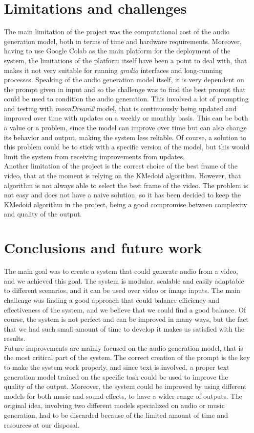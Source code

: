 \documentclass[conference]{IEEEtran}
\begin{document}
\section{Limitations and challenges}
The main limitation of the project was the computational cost of the audio generation model, both in terms of time and hardware requirements. 
Moreover, having to use Google Colab as the main platform for the deployment of the system, the limitations of the platform itself have been a point to deal with, that makes it not very suitable for running \textit{gradio} interfaces and long-running processes. 
Speaking of the audio generation model itself, it is very dependent on the prompt given in input and so the challenge was to find the best prompt that could be used to condition the audio generation.
This involved a lot of prompting and testing with \textit{moonDream2} model, that is continuously being updated and improved over time with updates on a weekly or monthly basis. This can be 
both a value or a problem, since the model can improve over time but can also change its behavior and output, making the system less reliable. Of course, a solution to this problem could be to stick with a specific version of the model, but this would limit the system from receiving improvements from updates.\\
Another limitation of the project is the correct choice of the best frame of the video, that at the moment is relying on the KMedoid algorithm. However, that algorithm is not always able to select the best frame of the video. 
The problem is not easy and does not have a naive solution, so it has been decided to keep the KMedoid algorithm in the project, being a good compromise between complexity and quality of the output.

\section{Conclusions and future work}
The main goal was to create a system that could generate audio from a video, and we achieved this goal. The system is modular, scalable and easily adaptable to different scenarios, and it can be used over video or image inputs. 
The main challenge was finding a good approach that could balance efficiency and effectiveness of the system, and we believe that we could find a good balance. Of course, the system is not perfect and can be improved in many ways, but the fact that we had such small amount of time to develop it makes us satisfied with the results.\\
Future improvements are mainly focused on the audio generation model, that is the most critical part of the system. The correct creation of the prompt is the key to make the system work properly, and since text is involved, a proper text generation model trained 
on the specific task could be used to improve the quality of the output. Moreover, the system could be improved by using different models for both music and sound effects, to have a wider range of outputs. The original idea, involving two different models specialized on audio or music generation, had to be discarded because of the limited amount of time and resources at our disposal.  
\end{document}
